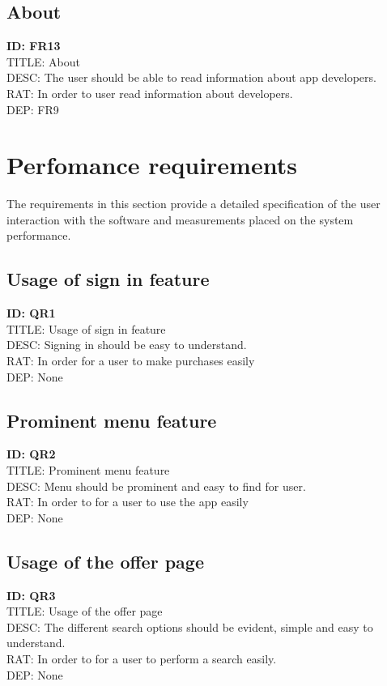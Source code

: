 \documentclass{scrreprt}
\begin{document}
\subsection{About}
\textbf{ID: FR13}\\
TITLE: About\\
DESC: The user should be able to read information about app developers.\\
RAT: In order to user read information about developers.\\
DEP: FR9

\section{Perfomance requirements}
The requirements in this section provide a detailed specification of the user interaction with the software
and measurements placed on the system performance. 

\subsection{Usage of sign in feature}
\textbf{ID: QR1}\\
TITLE: Usage of sign in feature\\
DESC:  Signing in should be easy to understand.\\
RAT: In order for a user to make purchases easily\\
DEP: None

\subsection{Prominent menu feature}
\textbf{ID: QR2}\\
TITLE: Prominent menu feature\\
DESC:  Menu should be prominent and easy to find for user.\\
RAT: In order to for a user to use the app easily\\
DEP: None

\subsection{Usage of the offer page}
\textbf{ID: QR3}\\
TITLE: Usage of the offer page\\
DESC:  The different search options should be evident, simple and easy to understand.\\
RAT: In order to for a user to perform a search easily.\\
DEP: None
\end{document}
